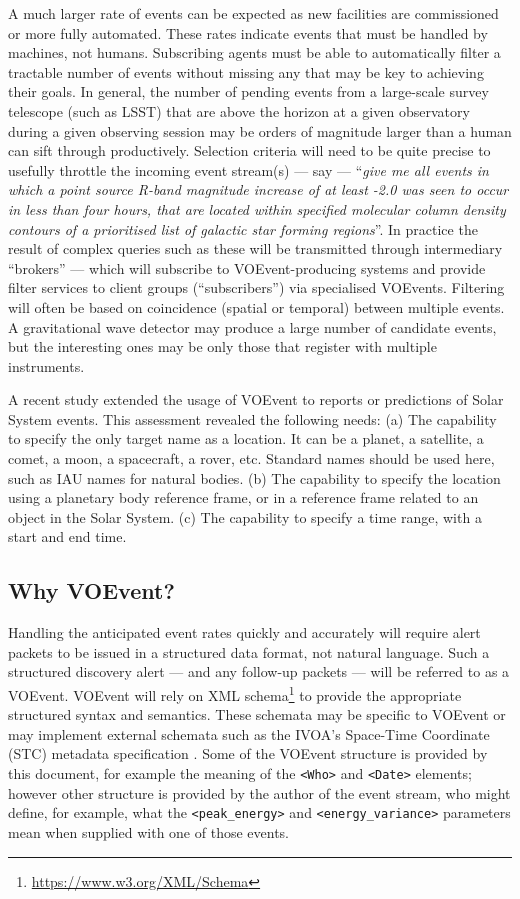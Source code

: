 \documentclass[11pt,a4paper]{ivoa}
\begin{document}
A much larger rate of events can be expected as new facilities are commissioned
or more fully automated. These rates indicate events that must be handled by
machines, not humans. Subscribing agents must be able to automatically filter a
tractable number of events without missing any that may be key to achieving
their goals. In general, the number of pending events from a large-scale survey
telescope (such as LSST) that are above the horizon at a given observatory
during a given observing session may be orders of magnitude larger than a human
can sift through productively. Selection criteria will need to be quite precise
to usefully throttle the incoming event stream(s) --- say --- ``\emph{give me
all events in which a point source R-band magnitude increase of at least -2.0
was seen to occur in less than four hours, that are located within specified
molecular column density contours of a prioritised list of galactic star forming
regions}''. In practice the result of complex queries such as these will be
transmitted through intermediary ``brokers'' --- which will subscribe to
VOEvent-producing systems and provide filter services to client groups
(``subscribers'') via specialised VOEvents. Filtering will often be based on
coincidence (spatial or temporal) between multiple events. A gravitational wave
detector may produce a large number of candidate events, but the interesting ones
may be only those that register with multiple instruments.

A recent study \citep{2018arXiv181112680C} extended the usage of VOEvent to
reports or predictions of Solar System events. This assessment revealed the
following needs: (a) The capability to specify the only target name as a
location. It can be a planet, a satellite, a comet, a moon, a spacecraft, a
rover, etc. Standard names should be used here, such as IAU names for natural
bodies. (b) The capability to specify the location using a planetary body
reference frame, or in a reference frame related to an object in the Solar
System. (c) The capability to specify a time range, with a start and end time.

\subsection{Why VOEvent?}

Handling the anticipated event rates quickly and accurately will require alert
packets to be issued in a structured data format, not natural language. Such a
structured discovery alert --- and any follow-up packets --- will be referred
to as a VOEvent. VOEvent will rely on XML
schema\footnote{\url{https://www.w3.org/XML/Schema}} to provide the appropriate
structured syntax and semantics. These schemata may be specific to VOEvent or
may implement external schemata such as the IVOA's Space-Time Coordinate (STC)
metadata specification \citep{2007ivoa.spec.1030R}. Some of the VOEvent structure
is provided by this document, for example the meaning of the \verb|<Who>|
and \verb|<Date>| elements; however other structure is provided by the author
of the event stream, who might define, for example, what the \verb|<peak_energy>|
and \verb|<energy_variance>| parameters mean when supplied with one of those events.
\end{document}
